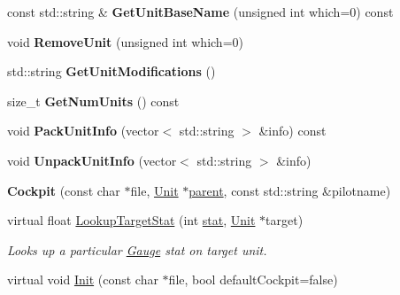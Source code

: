 \begin{DoxyCompactItemize}
\item 
const std\+::string \& {\bfseries Get\+Unit\+Base\+Name} (unsigned int which=0) const \hypertarget{classCockpit_ae99efc9f24d1be16f5454dc83e48d1cf}{}\label{classCockpit_ae99efc9f24d1be16f5454dc83e48d1cf}

\item 
void {\bfseries Remove\+Unit} (unsigned int which=0)\hypertarget{classCockpit_a82ef99d03fd9e178d5be38d3ebd748b0}{}\label{classCockpit_a82ef99d03fd9e178d5be38d3ebd748b0}

\item 
std\+::string {\bfseries Get\+Unit\+Modifications} ()\hypertarget{classCockpit_abb3618f27a8eef75cbf08d8be5459e2f}{}\label{classCockpit_abb3618f27a8eef75cbf08d8be5459e2f}

\item 
size\+\_\+t {\bfseries Get\+Num\+Units} () const \hypertarget{classCockpit_a304f2bdf891a120481bcbfa6e073c575}{}\label{classCockpit_a304f2bdf891a120481bcbfa6e073c575}

\item 
void {\bfseries Pack\+Unit\+Info} (vector$<$ std\+::string $>$ \&info) const \hypertarget{classCockpit_af8e1a107ee8e7b5d0fdf6f10d97c46ac}{}\label{classCockpit_af8e1a107ee8e7b5d0fdf6f10d97c46ac}

\item 
void {\bfseries Unpack\+Unit\+Info} (vector$<$ std\+::string $>$ \&info)\hypertarget{classCockpit_a1c76aabafdb15212845eec13eae59990}{}\label{classCockpit_a1c76aabafdb15212845eec13eae59990}

\item 
{\bfseries Cockpit} (const char $\ast$file, \hyperlink{classUnit}{Unit} $\ast$\hyperlink{classCockpit_a5a28bce27feff8d43de419368eb2da1c}{parent}, const std\+::string \&pilotname)\hypertarget{classCockpit_ab5475e4ad7960ec82e6853f7434f292b}{}\label{classCockpit_ab5475e4ad7960ec82e6853f7434f292b}

\item 
virtual float \hyperlink{classCockpit_a7a4c5ba80c42238eb5becb611bac0490}{Lookup\+Target\+Stat} (int \hyperlink{structstat}{stat}, \hyperlink{classUnit}{Unit} $\ast$target)\hypertarget{classCockpit_a7a4c5ba80c42238eb5becb611bac0490}{}\label{classCockpit_a7a4c5ba80c42238eb5becb611bac0490}

\begin{DoxyCompactList}\small\item\em Looks up a particular \hyperlink{classGauge}{Gauge} stat on target unit. \end{DoxyCompactList}\item 
virtual void \hyperlink{classCockpit_a4203dc3421c88348938455a73b3726bd}{Init} (const char $\ast$file, bool default\+Cockpit=false)\hypertarget{classCockpit_a4203dc3421c88348938455a73b3726bd}{}\label{classCockpit_a4203dc3421c88348938455a73b3726bd}


\end{DoxyCompactItemize}
